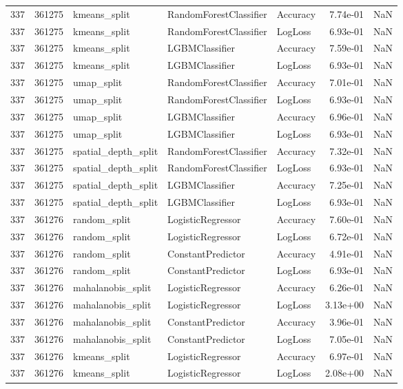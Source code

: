 \begin{tabular}{rrlllrr}
337 & 361275 & kmeans\_split & RandomForestClassifier & Accuracy & 7.74e-01 & NaN \\
337 & 361275 & kmeans\_split & RandomForestClassifier & LogLoss & 6.93e-01 & NaN \\
337 & 361275 & kmeans\_split & LGBMClassifier & Accuracy & 7.59e-01 & NaN \\
337 & 361275 & kmeans\_split & LGBMClassifier & LogLoss & 6.93e-01 & NaN \\
337 & 361275 & umap\_split & RandomForestClassifier & Accuracy & 7.01e-01 & NaN \\
337 & 361275 & umap\_split & RandomForestClassifier & LogLoss & 6.93e-01 & NaN \\
337 & 361275 & umap\_split & LGBMClassifier & Accuracy & 6.96e-01 & NaN \\
337 & 361275 & umap\_split & LGBMClassifier & LogLoss & 6.93e-01 & NaN \\
337 & 361275 & spatial\_depth\_split & RandomForestClassifier & Accuracy & 7.32e-01 & NaN \\
337 & 361275 & spatial\_depth\_split & RandomForestClassifier & LogLoss & 6.93e-01 & NaN \\
337 & 361275 & spatial\_depth\_split & LGBMClassifier & Accuracy & 7.25e-01 & NaN \\
337 & 361275 & spatial\_depth\_split & LGBMClassifier & LogLoss & 6.93e-01 & NaN \\
337 & 361276 & random\_split & LogisticRegressor & Accuracy & 7.60e-01 & NaN \\
337 & 361276 & random\_split & LogisticRegressor & LogLoss & 6.72e-01 & NaN \\
337 & 361276 & random\_split & ConstantPredictor & Accuracy & 4.91e-01 & NaN \\
337 & 361276 & random\_split & ConstantPredictor & LogLoss & 6.93e-01 & NaN \\
337 & 361276 & mahalanobis\_split & LogisticRegressor & Accuracy & 6.26e-01 & NaN \\
337 & 361276 & mahalanobis\_split & LogisticRegressor & LogLoss & 3.13e+00 & NaN \\
337 & 361276 & mahalanobis\_split & ConstantPredictor & Accuracy & 3.96e-01 & NaN \\
337 & 361276 & mahalanobis\_split & ConstantPredictor & LogLoss & 7.05e-01 & NaN \\
337 & 361276 & kmeans\_split & LogisticRegressor & Accuracy & 6.97e-01 & NaN \\
337 & 361276 & kmeans\_split & LogisticRegressor & LogLoss & 2.08e+00 & NaN \\

\end{tabular}
